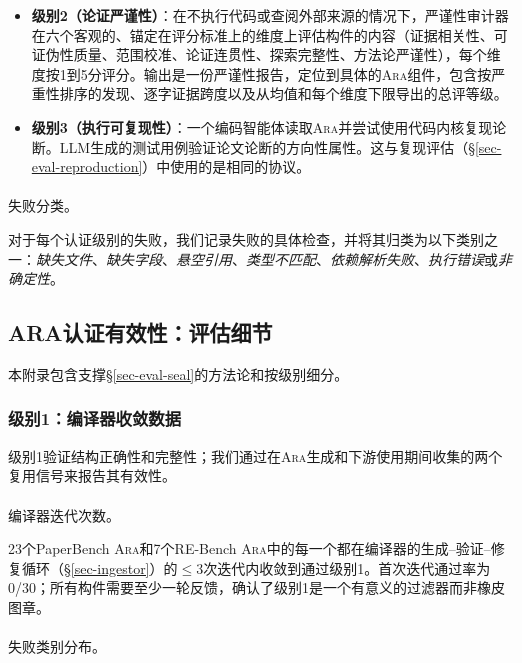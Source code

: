\documentclass[
]{article}
\makeatletter
\let\oldparagraph\paragraph
\renewcommand{\paragraph}{
    \@ifstar
      \xxxParagraphStar
      \xxxParagraphNoStar
  }
\newcommand{\xxxParagraphStar}[1]{\oldparagraph*{#1}\mbox{}}
\newcommand{\xxxParagraphNoStar}[1]{\oldparagraph{#1}\mbox{}}
\theoremstyle{definition}
\newcommand{\ara}{\textsc{Ara}}
\makeatother
\begin{document}
\begin{itemize}
\item
  \textbf{级别2（论证严谨性）}：在不执行代码或查阅外部来源的情况下，严谨性审计器在六个客观的、锚定在评分标准上的维度上评估构件的内容（证据相关性、可证伪性质量、范围校准、论证连贯性、探索完整性、方法论严谨性），每个维度按1到5分评分。输出是一份严谨性报告，定位到具体的\ara{}组件，包含按严重性排序的发现、逐字证据跨度以及从均值和每个维度下限导出的总评等级。
\item
  \textbf{级别3（执行可复现性）}：一个编码智能体读取\ara{}并尝试使用代码内核复现论断。LLM生成的测试用例验证论文论断的方向性属性。这与复现评估（\S\ref{sec-eval-reproduction}）中使用的是相同的协议。
\end{itemize}

\paragraph{失败分类。}\label{ux5931ux8d25ux5206ux7c7b}

对于每个认证级别的失败，我们记录失败的具体检查，并将其归类为以下类别之一：\emph{缺失文件}、\emph{缺失字段}、\emph{悬空引用}、\emph{类型不匹配}、\emph{依赖解析失败}、\emph{执行错误}或\emph{非确定性}。

\subsection{ARA认证有效性：评估细节}\label{sec-app-seal-eval}

本附录包含支撑\S\ref{sec-eval-seal}的方法论和按级别细分。

\subsubsection{级别1：编译器收敛数据}\label{sec-app-seal-eval-l1}

级别1验证结构正确性和完整性；我们通过在\ara{}生成和下游使用期间收集的两个复用信号来报告其有效性。

\paragraph{编译器迭代次数。}\label{ux7f16ux8bd1ux5668ux8fedux4ee3ux6b21ux6570}

23个PaperBench \ara{}和7个RE-Bench
\ara{}中的每一个都在编译器的生成--验证--修复循环（\S\ref{sec-ingestor}）的\(\leq 3\)次迭代内收敛到通过级别1。首次迭代通过率为0/30；所有构件需要至少一轮反馈，确认了级别1是一个有意义的过滤器而非橡皮图章。

\paragraph{失败类别分布。}\label{ux5931ux8d25ux7c7bux522bux5206ux5e03}
\end{document}
